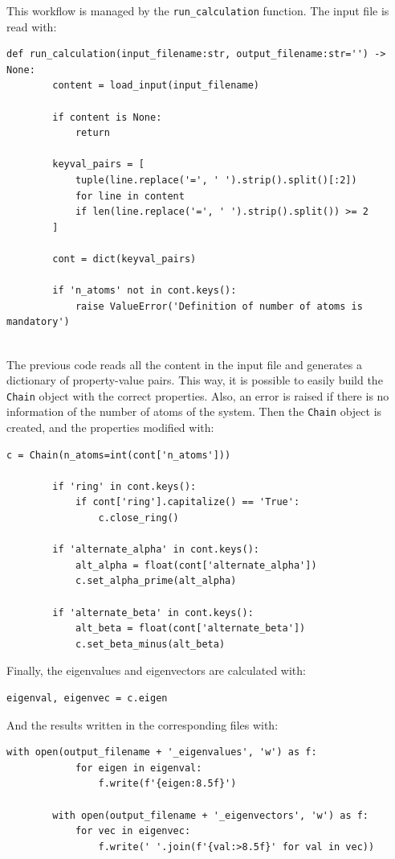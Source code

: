 \documentclass{article}
\begin{document}
This workflow is managed by the \texttt{run\_calculation} function. The input file is read with:

\begin{lstlisting}[backgroundcolor=\color{LightGray}]
    def run_calculation(input_filename:str, output_filename:str='') -> None:
        content = load_input(input_filename)
    
        if content is None:
            return
    
        keyval_pairs = [ 
            tuple(line.replace('=', ' ').strip().split()[:2])
            for line in content 
            if len(line.replace('=', ' ').strip().split()) >= 2
        ]
    
        cont = dict(keyval_pairs)
    
        if 'n_atoms' not in cont.keys():
            raise ValueError('Definition of number of atoms is mandatory')
    
\end{lstlisting} 

The previous code reads all the content in the input file and generates a dictionary of property-value pairs. This way, it is possible to easily build the \texttt{Chain} object with the correct properties. Also, an error is raised if there is no information of the number of atoms of the system. Then the \texttt{Chain} object is created, and the properties modified with:

\begin{lstlisting}[backgroundcolor=\color{LightGray}]
        c = Chain(n_atoms=int(cont['n_atoms']))

        if 'ring' in cont.keys():
            if cont['ring'].capitalize() == 'True':
                c.close_ring()
    
        if 'alternate_alpha' in cont.keys():
            alt_alpha = float(cont['alternate_alpha'])
            c.set_alpha_prime(alt_alpha)
    
        if 'alternate_beta' in cont.keys():
            alt_beta = float(cont['alternate_beta'])
            c.set_beta_minus(alt_beta)
\end{lstlisting} 

Finally, the eigenvalues and eigenvectors are calculated with:
\begin{lstlisting}[backgroundcolor=\color{LightGray}]
        eigenval, eigenvec = c.eigen    
\end{lstlisting} 

And the results written in the corresponding files with: 
\begin{lstlisting}[backgroundcolor=\color{LightGray}]
        with open(output_filename + '_eigenvalues', 'w') as f:
            for eigen in eigenval:
                f.write(f'{eigen:8.5f}')
        
        with open(output_filename + '_eigenvectors', 'w') as f:
            for vec in eigenvec:
                f.write(' '.join(f'{val:>8.5f}' for val in vec))
\end{lstlisting} 
\end{document}
